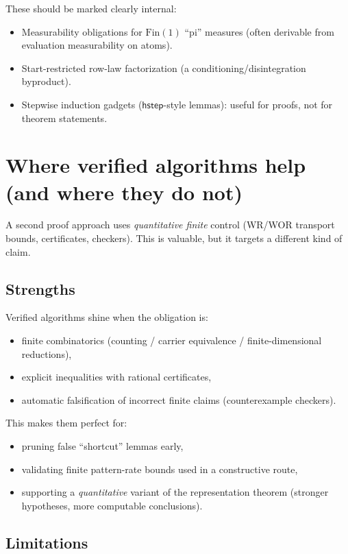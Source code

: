 \documentclass[11pt]{article}
\newcommand{\Fin}{\mathrm{Fin}}
\begin{document}
These should be marked clearly internal:
\begin{itemize}[leftmargin=2em]
\item Measurability obligations for \(\Fin(1)\) ``pi'' measures (often derivable from evaluation measurability on atoms).
\item Start-restricted row-law factorization (a conditioning/disintegration byproduct).
\item Stepwise induction gadgets (\(\mathsf{hstep}\)-style lemmas): useful for proofs, not for theorem statements.
\end{itemize}

\section{Where verified algorithms help (and where they do not)}

A second proof approach uses \emph{quantitative finite} control (WR/WOR transport bounds, certificates, checkers).
This is valuable, but it targets a different kind of claim.

\subsection{Strengths}

Verified algorithms shine when the obligation is:
\begin{itemize}[leftmargin=2em]
\item finite combinatorics (counting / carrier equivalence / finite-dimensional reductions),
\item explicit inequalities with rational certificates,
\item automatic falsification of incorrect finite claims (counterexample checkers).
\end{itemize}

This makes them perfect for:
\begin{itemize}[leftmargin=2em]
\item pruning false ``shortcut'' lemmas early,
\item validating finite pattern-rate bounds used in a constructive route,
\item supporting a \emph{quantitative} variant of the representation theorem (stronger hypotheses, more computable conclusions).
\end{itemize}

\subsection{Limitations}
\end{document}
